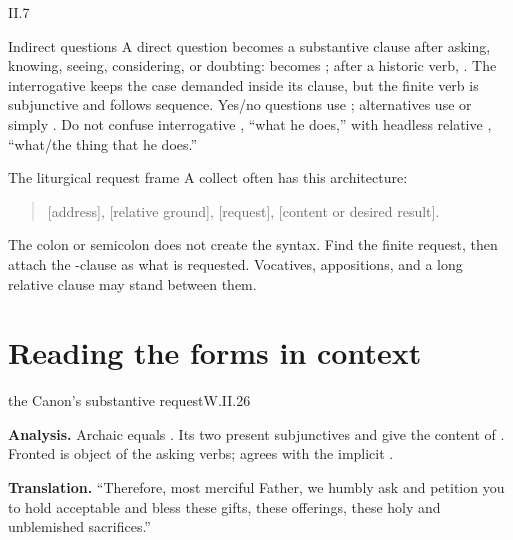 \begin{courseunit}{II.7}
\begin{grammarbox}{Indirect questions}
A direct question becomes a substantive clause after asking, knowing, seeing, considering, or
doubting:  becomes ; after a historic verb,
.  The interrogative keeps the case demanded inside its clause,
but the finite verb is subjunctive and follows sequence.  Yes/no questions use ;
alternatives use  or simply .  Do not confuse
interrogative , ``what he does,'' with headless relative
, ``what/the thing that he does.''
\end{grammarbox}

\begin{grammarbox}{The liturgical request frame}
A collect often has this architecture:
\begin{quote}
 [address],  [relative ground],
 [request],  [content or desired result].
\end{quote}
The colon or semicolon does not create the syntax.  Find the finite request, then attach the
-clause as what is requested.  Vocatives, appositions, and a long relative clause
may stand between them.
\end{grammarbox}

\section{Reading the forms in context}

\begin{workedexample}{the Canon's substantive request}{W.II.26}

\textbf{Analysis.}  Archaic  equals .  Its two present subjunctives
 and  give the content of .  Fronted
 is object of the asking verbs;  agrees with the implicit
.

\textbf{Translation.}  ``Therefore, most merciful Father, we humbly ask and petition you to
hold acceptable and bless these gifts, these offerings, these holy and unblemished
sacrifices.''
\end{workedexample}


\end{courseunit}
